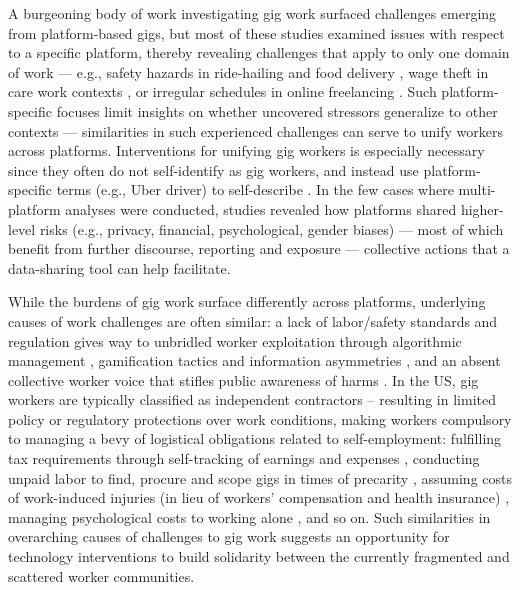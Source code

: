 {A burgeoning body of work investigating} gig work surfaced challenges emerging from {platform-based gigs}{, but most of these studies examined issues with respect to a specific platform, thereby revealing challenges that apply to only one domain of work --- e.g., safety hazards in ride-hailing and food delivery \cite{nilsenhealth, stressfulride, healthdrive, deliverysafe}, wage theft in care work contexts \cite{ming2024wage, cole2024wage, jerseycare}, or irregular schedules in online freelancing \cite{sousveillance, personal, freelancecontrol}. Such platform-specific focuses limit insights on whether uncovered stressors generalize to other contexts --- similarities in such experienced challenges can serve to unify workers across platforms. Interventions for unifying gig workers is especially necessary since they often do not self-identify as gig workers, and instead use platform-specific terms (e.g., Uber driver) to self-describe \cite{supporting}. In the few cases where multi-platform analyses were conducted, studies revealed how platforms shared higher-level risks (e.g., privacy, financial, psychological, gender biases) \cite{privacy, toward, ma2022brush} --- most of which benefit from further discourse, reporting and exposure --- collective actions that a data-sharing tool can help facilitate.}

{While the burdens of gig work surface differently across platforms, underlying causes of work challenges are often similar: a lack of labor/safety standards and regulation gives way to unbridled worker exploitation through algorithmic management \cite{dubal2023algorithmic, machines, excessive}, gamification tactics and information asymmetries \cite{algorithmic, locus, zhang2022algorithmic}, and an absent collective worker voice that stifles public awareness of harms \cite{ming2024wage, cole2024wage, lastmile}.}
In the {US}, gig workers are typically classified as independent contractors -- resulting in limited policy or regulatory protections over work conditions, {making} workers {compulsory} to manag{ing} a bevy of {logistical} obligations related to self-employment{: fulfilling tax requirements \cite{taxing, tax, tax_lives, returns} through self-}tracking {of} earnings and expenses \cite{accountable, taming}, {conducting unpaid labor to find, procure and scope gigs in times of precarity \cite{youth, france, freelancecontrol}, assuming costs of work-induced injuries (in lieu of workers' compensation and health insurance) \cite{nilsenhealth, healthdrive, deliverysafe, codesign}, managing psychological costs to
working alone \cite{atom, alienated, commodified}, and so on.} {Such similarities in overarching causes of challenges to gig work suggests an opportunity for technology interventions to build solidarity between the currently fragmented and scattered worker communities.}

